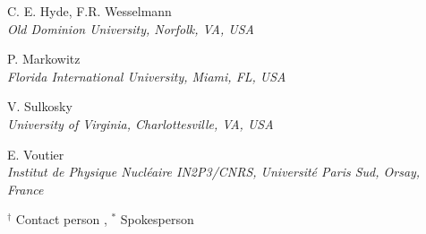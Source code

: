 \documentclass{article}
\begin{document}
\begin{center}
C. E. Hyde, F.R. Wesselmann \\
{\it Old Dominion University, Norfolk, VA, USA}
\vspace*{15pt}

P. Markowitz\\
{\it Florida International University, Miami, FL, USA}
\vspace*{15pt}

\clearpage
V. Sulkosky  \\
{\it University of Virginia, Charlottesville, VA, USA}
\vspace*{15pt}

E. Voutier\\
{\it Institut de Physique Nucl\'eaire IN2P3/CNRS, Universit\'e Paris Sud, 
Orsay, France}
\vspace*{15pt}

\end{center}

$^\dagger$ Contact person , $^\ast$ Spokesperson

\vfill\eject

\clearpage



\newpage

\tableofcontents
\end{document}
